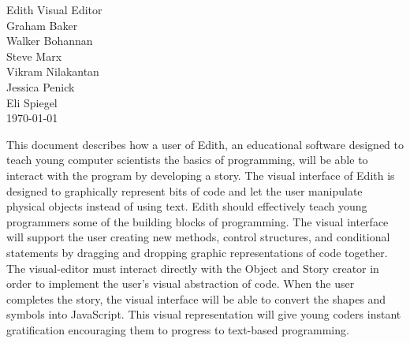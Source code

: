 \documentclass[a4paper, 10pt, oneside]{article}
\begin{document}
\begin{titlepage}
    \vspace*{75pt} %
    \begin{center}
        {\Huge Edith Visual Editor}\\ [1cm]	%
		{\Large Graham Baker\\
Walker Bohannan\\
Steve Marx    \\
Vikram Nilakantan\\
Jessica Penick\\
Eli Spiegel \\
}
    \today %
\vspace*{75pt}
		

\end{center}
\noindent This document describes how a user of Edith, an educational software designed to teach young computer scientists the basics of programming, will be able to interact with the program by developing a story. The visual interface of Edith is designed to graphically represent bits of code and let the user manipulate physical objects instead of using text. Edith should effectively teach young programmers some of the building blocks of programming. The visual interface will support the user creating new methods, control structures, and conditional statements by dragging and dropping graphic representations of code together. The visual-editor must interact directly with the Object and Story creator in order to implement the user's visual abstraction of code. When the user completes the story, the visual interface will be able to convert the shapes and symbols into JavaScript. This visual representation will give young coders instant gratification encouraging them to progress to text-based programming. 
	
	\vspace*{\fill}
\end{titlepage}
\end{document}
